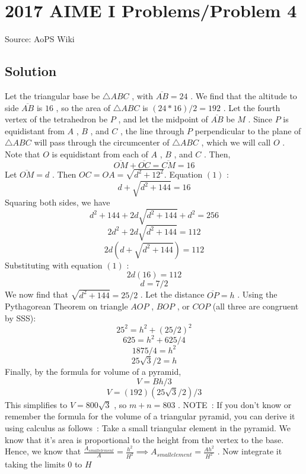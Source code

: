 \documentclass[12pt]{article}
\begin{document}
\section*{{2017 AIME I Problems/Problem 4}}
Source: AoPS Wiki

\subsection*{Solution}
Let the triangular base be $\triangle ABC$ , with $\overline {AB} = 24$ . We find that the altitude to side $\overline {AB}$ is $16$ , so the area of $\triangle ABC$ is $(24*16)/2 = 192$ . Let the fourth vertex of the tetrahedron be $P$ , and let the midpoint of $\overline {AB}$ be $M$ . Since $P$ is equidistant from $A$ , $B$ , and $C$ , the line through $P$ perpendicular to the plane of $\triangle ABC$ will pass through the circumcenter of $\triangle ABC$ , which we will call $O$ . Note that $O$ is equidistant from each of $A$ , $B$ , and $C$ . Then, \[\overline {OM} + \overline {OC} = \overline {CM} = 16\] Let $\overline {OM} = d$ . Then $OC=OA=\sqrt{d^2+12^2}.$ Equation $(1)$ : \[d + \sqrt {d^2 + 144} = 16\] Squaring both sides, we have \[d^2 + 144 + 2d\sqrt {d^2+144} + d^2 = 256\] \[2d^2 + 2d\sqrt {d^2+144} = 112\] \[2d(d + \sqrt {d^2+144}) = 112\] Substituting with equation $(1)$ : \[2d(16) = 112\] \[d = 7/2\] We now find that $\sqrt{d^2 + 144} = 25/2$ . Let the distance $\overline {OP} = h$ . Using the Pythagorean Theorem on triangle $AOP$ , $BOP$ , or $COP$ (all three are congruent by SSS): \[25^2 = h^2 + (25/2)^2\] \[625 = h^2 + 625/4\] \[1875/4 = h^2\] \[25\sqrt {3} / 2 = h\] Finally, by the formula for volume of a pyramid, \[V = Bh/3\] \[V = (192)(25\sqrt{3}/2)/3\] This simplifies to $V = 800\sqrt {3}$ , so $m+n = \boxed {803}$ . NOTE : If you don’t know or remember the formula for the volume of a triangular pyramid, you can derive it using calculus as follows : Take a small triangular element in the pyramid. We know that it’s area is proportional to the height from the vertex to the base. Hence, we know that $\frac{A_{small element}}{A} = \frac{h^2}{H^2} \implies A_{small element} = \frac{Ah^2}{H^2}$ . Now integrate it taking the limits $0$ to $H$
\end{document}
